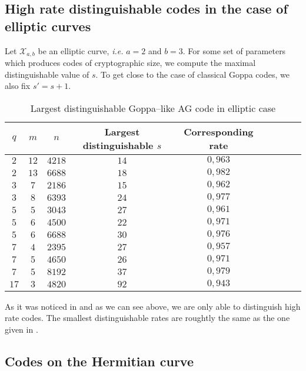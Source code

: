 \documentclass[a4paper]{amsart}
\theoremstyle{definition}
\theoremstyle{remark}
\newcommand{\calX}{\mathcal{X}}
\begin{document}
\subsection{High rate distinguishable codes in the case of elliptic curves}

Let $\calX_{a,b}$ be an elliptic curve, \emph{i.e.} $a=2$ and $b=3$. For some set of parameters which produces codes of cryptographic size, we compute the maximal distinguishable value of $s$. To get close to the case of classical Goppa codes, we also fix $s'=s+1$.
\begin{table}[h]
\begin{center}
\begin{tabular}{|c|c|c||c|c|c|c|c|c|}
    \hline
    $q$ & $m$ & $n$ & Largest distinguishable $s$ & Corresponding rate\\
    \hline \hline
     $2$ & $12$ & $4218$ & $14$ & $0,963$ \\
    \hline 
     $2$ & $13$ & $6688$ & $18$ & $0,982$  \\
    \hline \hline
     $3$ & $7$ & $2186$ & $15$ & $0,962$ \\
    \hline
     $3$ & $8$ & $6393$ & $24$ & $0,977$ \\
    \hline \hline
     $5$ & $5$ & $3043$ & $27$ & $0,961$  \\
    \hline
     $5$ & $6$ & $4500$ & $22$ & $0,971$ \\
    \hline
     $5$  & $6$ & $6688$ & $30$ & $0,976$ \\
    \hline \hline
     $7$ & $4$ & $2395$ & $27$ & $0,957$ \\
    \hline
      $7$ & $5$ & $4650$ & $26$ & $0,971$ \\
    \hline
      $7$ & $5$ & $8192$ & $37$ & $0,979$ \\
    \hline \hline
      $17$ & $3$ & $4820$ & $92$ & $0,943$ \\
    \hline
\end{tabular}
\caption{Largest distinguishable Goppa--like AG code in elliptic case}
\end{center}
\end{table}

As it was noticed in \cite{MT21} and as we can see above, we are only able to distinguish high rate codes. The smallest distinguishable rates are roughtly the same as the one given in \cite{MT21}. 

\subsection{Codes on the Hermitian curve}
\end{document}
